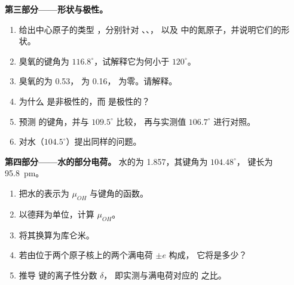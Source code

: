 \begin{problem}
\medskip
\noindent\textbf{第三部分——形状与极性。}
\begin{enumerate}[resume]
  \item 给出中心原子的类型 ，分别针对 、、，
        以及  中的氮原子，并说明它们的形状。
  \item 臭氧的键角为 $116.8^\circ$，试解释它为何小于
        $120^\circ$。
  \item 臭氧的为 \qty{0.53}{\debye}， 为
        \qty{0.16}{\debye}， 为零。请解释。
  \item 为什么  是非极性的，而  是极性的？
  \item 预测  的键角，并与 $109.5^\circ$ 比较，
        再与实测值 $106.7^\circ$ 进行对照。
  \item 对水（$104.5^\circ$）提出同样的问题。
\end{enumerate}

\medskip
\noindent\textbf{第四部分——水的部分电荷。}
水的为 \qty{1.857}{\debye}，其键角为
$104.48^\circ$， 键长为 \qty{95.8}{pm}。
\begin{enumerate}[resume]
  \item 把水的表示为
        $\mu_{OH}$ 与键角的函数。
  \item 以德拜为单位，计算 $\mu_{OH}$。
  \item 将其换算为库仑米。
  \item 若由位于两个原子核上的两个满电荷 $\pm e$ 构成，
        它将是多少？
  \item 推导  键的离子性分数 $\delta$，
        即实测与满电荷对应的
        之比。
\end{enumerate}
\end{problem}
